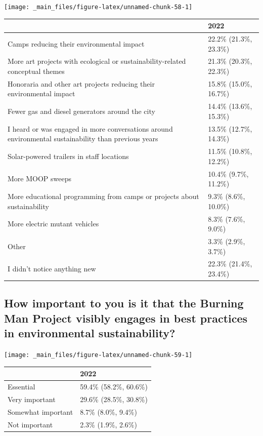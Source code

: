 \documentclass[
]{book}
\begin{document}
\texttt{[image: \_main\_files/figure-latex/unnamed-chunk-58-1]}

\begin{table}
\centering
\begin{tabular}[t]{>{}l|>{}l}
\hline
  & 2022\\
\hline
Camps reducing their 
 environmental impact & 22.2\% (21.3\%, 23.3\%)\\
\hline
More art projects with 
 ecological or sustainability-related 
 conceptual themes & 21.3\% (20.3\%, 22.3\%)\\
\hline
Honoraria and other 
 art projects reducing 
 their environmental impact & 15.8\% (15.0\%, 16.7\%)\\
\hline
Fewer gas and diesel generators 
 around the city & 14.4\% (13.6\%, 15.3\%)\\
\hline
I heard or was engaged in more 
 conversations around environmental sustainability 
 than previous years & 13.5\% (12.7\%, 14.3\%)\\
\hline
Solar-powered trailers 
 in staff locations & 11.5\% (10.8\%, 12.2\%)\\
\hline
More MOOP sweeps & 10.4\% (9.7\%, 11.2\%)\\
\hline
More educational programming 
 from camps or projects 
 about sustainability & 9.3\% (8.6\%, 10.0\%)\\
\hline
More electric mutant vehicles & 8.3\% (7.6\%, 9.0\%)\\
\hline
Other & 3.3\% (2.9\%, 3.7\%)\\
\hline
I didn't notice anything new & 22.3\% (21.4\%, 23.4\%)\\
\hline
\end{tabular}
\end{table}

\hypertarget{how-important-to-you-is-it-that-the-burning-man-project-visibly-engages-in-best-practices-in-environmental-sustainability}{%
\subsection{How important to you is it that the Burning Man Project visibly engages in best practices in environmental sustainability?}\label{how-important-to-you-is-it-that-the-burning-man-project-visibly-engages-in-best-practices-in-environmental-sustainability}}

\texttt{[image: \_main\_files/figure-latex/unnamed-chunk-59-1]}

\begin{table}
\centering
\begin{tabular}[t]{>{}l|>{}l}
\hline
  & 2022\\
\hline
Essential & 59.4\% (58.2\%, 60.6\%)\\
\hline
Very important & 29.6\% (28.5\%, 30.8\%)\\
\hline
Somewhat important & 8.7\% (8.0\%, 9.4\%)\\
\hline
Not important & 2.3\% (1.9\%, 2.6\%)\\
\hline
\end{tabular}
\end{table}
\end{document}

